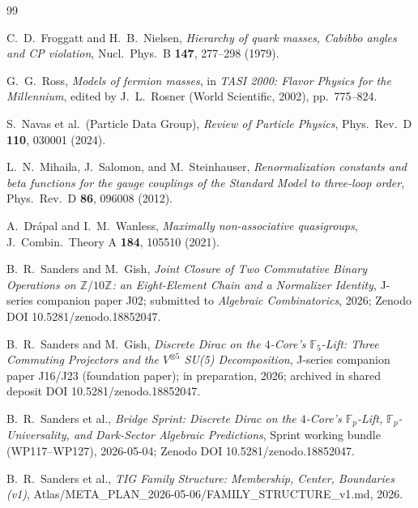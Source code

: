 \documentclass[11pt,reqno]{amsart}
\theoremstyle{plain}
\theoremstyle{definition}
\theoremstyle{remark}
\newcommand{\F}{\mathbb{F}}
\begin{document}
\begin{thebibliography}{99}

C.~D.~Froggatt and H.~B.~Nielsen,
\emph{Hierarchy of quark masses, Cabibbo angles and CP
violation},
Nucl.\ Phys.\ B \textbf{147}, 277--298 (1979).

G.~G.~Ross,
\emph{Models of fermion masses},
in \emph{TASI 2000: Flavor Physics for the Millennium}, edited
by J.~L.~Rosner (World Scientific, 2002), pp.\ 775--824.

S.~Navas et al.\ (Particle Data Group),
\emph{Review of Particle Physics},
Phys.\ Rev.\ D \textbf{110}, 030001 (2024).

L.~N.~Mihaila, J.~Salomon, and M.~Steinhauser,
\emph{Renormalization constants and beta functions for the
gauge couplings of the Standard Model to three-loop order},
Phys.\ Rev.\ D \textbf{86}, 096008 (2012).

A.~Dr\'apal and I.~M.~Wanless,
\emph{Maximally non-associative quasigroups},
J.\ Combin.\ Theory A \textbf{184}, 105510 (2021).

B.~R.~Sanders and M.~Gish,
\emph{Joint Closure of Two Commutative Binary Operations on
$\mathbb{Z}/10\mathbb{Z}$: an Eight-Element Chain and a
Normalizer Identity},
J-series companion paper J02; submitted to
\emph{Algebraic Combinatorics}, 2026;
Zenodo DOI 10.5281/zenodo.18852047.

B.~R.~Sanders and M.~Gish,
\emph{Discrete Dirac on the $4$-Core's $\F_{5}$-Lift:
Three Commuting Projectors and the $V^{\otimes 5}$ SU(5)
Decomposition},
J-series companion paper J16/J23 (foundation paper);
in preparation, 2026;
archived in shared deposit DOI 10.5281/zenodo.18852047.

B.~R.~Sanders et al.,
\emph{Bridge Sprint: Discrete Dirac on the $4$-Core's
$\F_{p}$-Lift, $\F_{p}$-Universality, and Dark-Sector
Algebraic Predictions},
Sprint working bundle (WP117--WP127), 2026-05-04;
Zenodo DOI 10.5281/zenodo.18852047.

B.~R.~Sanders et al.,
\emph{TIG Family Structure: Membership, Center, Boundaries
(v1)},
Atlas/META\_PLAN\_2026-05-06/FAMILY\_STRUCTURE\_v1.md, 2026.

\end{thebibliography}
\end{document}

